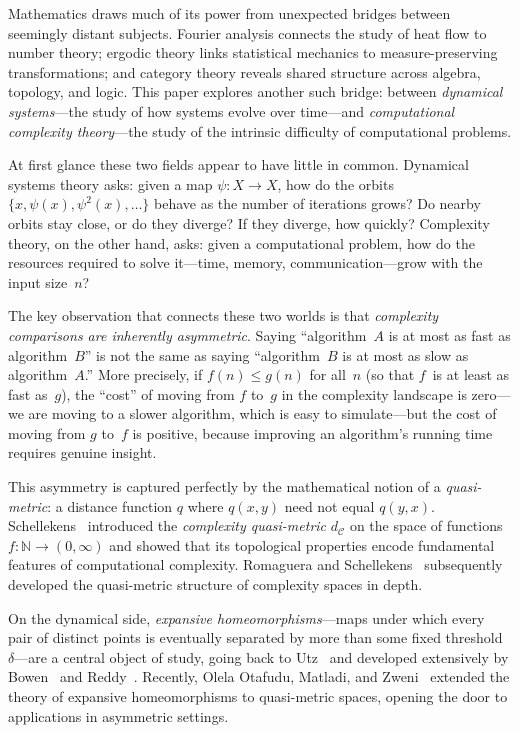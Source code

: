 \documentclass[11pt,a4paper]{article}
\theoremstyle{plain}
\theoremstyle{definition}
\newcommand{\N}{\mathbb{N}}
\newcommand{\C}{\mathcal{C}}
\begin{document}
Mathematics draws much of its power from unexpected bridges between
seemingly distant subjects.  Fourier analysis connects the study of
heat flow to number theory; ergodic theory links statistical mechanics
to measure-preserving transformations; and category theory reveals
shared structure across algebra, topology, and logic.  This paper
explores another such bridge: between \emph{dynamical systems}---the
study of how systems evolve over time---and \emph{computational
complexity theory}---the study of the intrinsic difficulty of
computational problems.

At first glance these two fields appear to have little in common.
Dynamical systems theory asks: given a map $\psi\colon X\to X$,
how do the orbits $\{x,\psi(x),\psi^2(x),\ldots\}$ behave as the
number of iterations grows?  Do nearby orbits stay close, or do they
diverge?  If they diverge, how quickly?  Complexity theory, on the
other hand, asks: given a computational problem, how do the resources
required to solve it---time, memory, communication---grow with the
input size~$n$?

The key observation that connects these two worlds is that
\emph{complexity comparisons are inherently asymmetric}.  Saying
``algorithm~$A$ is at most as fast as algorithm~$B$'' is not the
same as saying ``algorithm~$B$ is at most as slow as algorithm~$A$.''
More precisely, if $f(n)\le g(n)$ for all~$n$ (so that $f$~is at
least as fast as~$g$), the ``cost'' of moving from $f$ to~$g$ in the
complexity landscape is zero---we are moving to a slower algorithm,
which is easy to simulate---but the cost of moving from $g$ to~$f$ is
positive, because improving an algorithm's running time requires
genuine insight.

This asymmetry is captured perfectly by the mathematical notion of a
\emph{quasi-metric}: a distance function $q$ where $q(x,y)$ need not
equal $q(y,x)$.  Schellekens~\cite{schellekens1995} introduced the
\emph{complexity quasi-metric} $d_\C$ on the space of functions
$f\colon\N\to(0,\infty)$ and showed that its topological properties
encode fundamental features of computational complexity.  Romaguera
and Schellekens~\cite{romaguera1999} subsequently developed the
quasi-metric structure of complexity spaces in depth.

On the dynamical side, \emph{expansive homeomorphisms}---maps under
which every pair of distinct points is eventually separated by more
than some fixed threshold~$\delta$---are a central object of study,
going back to Utz~\cite{utz1950} and developed extensively by
Bowen~\cite{bowen1975} and Reddy~\cite{reddy1983}.  Recently, Olela
Otafudu, Matladi, and Zweni~\cite{olela2024} extended the theory of
expansive homeomorphisms to quasi-metric spaces, opening the door to
applications in asymmetric settings.
\end{document}
